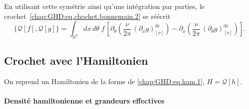 En utilisant cette symétrie ainsi qu’une intégration par parties, le crochet~\eqref{chap:GHD:eq.chochet.bonnemain.2} se réécrit
\begin{equation}\label{chap:GHD:eq.chochet.bonnemain.3}
	\{\mathcal{Q}[f], \mathcal{Q}[g]\}
	= \int_{\mathbb{R}^2} dx\, d\theta \; f \,
	\left[
		\partial_\theta \left( \frac{\nu}{2\pi} \, (\partial_x g)^{\mathrm{dr}}_{[\nu]} \right)
		- \partial_x \left( \frac{\nu}{2\pi} \, (\partial_\theta g)^{\mathrm{dr}}_{[\nu]} \right)
	\right].
\end{equation}

\medskip

\subsection{Crochet avec l’Hamiltonien}

On reprend un Hamiltonien de la forme de \eqref{chap:GHD:eq.ham.1},  $H = \mathcal{Q}[h]$. 

\paragraph{Densité hamiltonienne et grandeurs effectives} 



